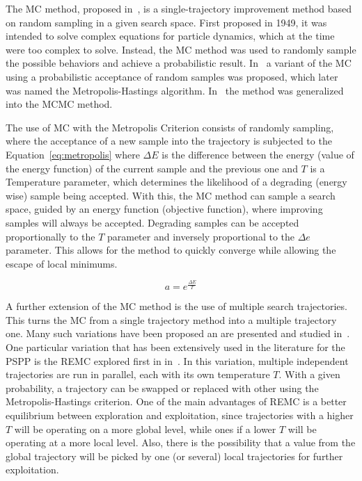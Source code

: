 The \ac{MC} method, proposed in~\cite{metropolis1949monte},
is a single-trajectory improvement method based on random sampling in a given search
space. First proposed in
1949, it was intended to solve complex equations for particle dynamics,
which at the time were too complex to solve. Instead, the \ac{MC} method was
used to randomly sample the possible behaviors and achieve a probabilistic
result. In~\cite{metropolis1953equation} a variant of the \ac{MC} using a probabilistic
acceptance of random samples was proposed, which later was named
the Metropolis-Hastings algorithm. In~\cite{hastings1970monte} the
method was generalized into the \ac{MCMC} method.

The use of \ac{MC} with the Metropolis Criterion consists of randomly sampling,
where the acceptance of a new sample into the trajectory is subjected to
the Equation~\eqref{eq:metropolis} where $\Delta E$ is the difference
between the energy (value of the energy function) of the current sample and
the previous one and $T$ is a Temperature parameter, which determines the
likelihood of a degrading (energy wise) sample being accepted. With this,
the \ac{MC} method can sample a search space, guided by an energy function
(objective function), where improving samples will always be accepted.
Degrading samples can be accepted proportionally to the $T$ parameter
and inversely proportional to the $\Delta e$ parameter. This allows
for the method to quickly converge while allowing the escape
of local minimums.

\begin{equation} \label{eq:metropolis}
    a = e^\frac{\Delta E}{T}
\end{equation}

A further extension of the \ac{MC} method is the use of multiple
search trajectories. This turns the \ac{MC} from a single trajectory
method into a multiple trajectory one. Many such variations
have been proposed an are presented and studied in~\cite{iba2001extended}.
One particular variation that has been extensively used
in the literature for the PSPP is the \ac{REMC}
explored first in in~\cite{swendsen1986replica}. In this variation,
multiple independent trajectories are run in parallel, each
with its own temperature $T$. With a given probability, a trajectory
can be swapped or replaced with other using the Metropolis-Hastings
criterion. One of the main advantages of \ac{REMC} is a better equilibrium
between exploration and exploitation, since trajectories with a higher
$T$ will be operating on a more global level, while ones if a lower $T$
will be operating at a more local level. Also, there is the possibility
that a value from the global trajectory will be picked by one (or several)
local trajectories for further exploitation.

